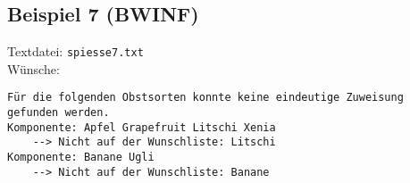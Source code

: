 \subsection{Beispiel 7 (BWINF)}\label{example:7}
Textdatei: \texttt{spiesse7.txt}\\

\noindent
Wünsche: \\
\vspace{7pt}

\noindent
{}
\begin{verbatim}
Für die folgenden Obstsorten konnte keine eindeutige Zuweisung gefunden werden.
Komponente: Apfel Grapefruit Litschi Xenia 
	--> Nicht auf der Wunschliste: Litschi 
Komponente: Banane Ugli 
	--> Nicht auf der Wunschliste: Banane 
\end{verbatim}

